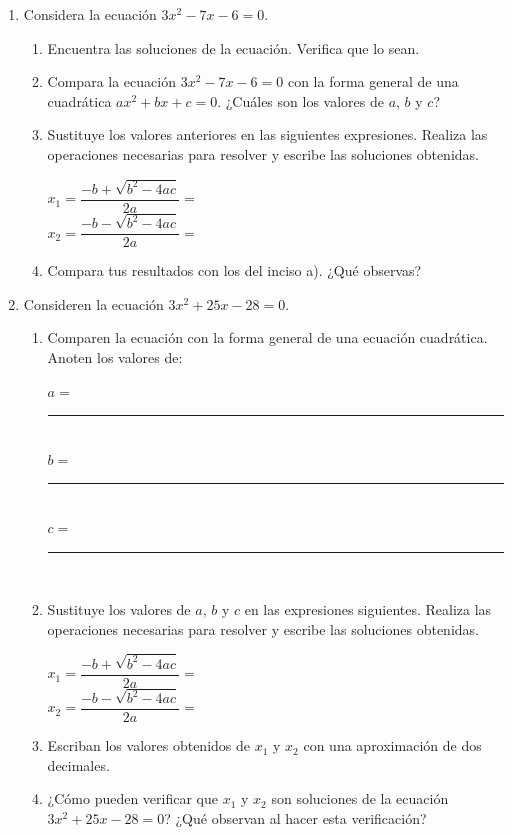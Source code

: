 \documentclass[11pt]{book}
\begin{document}
\begin{enumerate}
  \item Considera la ecuación $3x^2 - 7x - 6 = 0$.
        \begin{enumerate}
          \item Encuentra las soluciones de la ecuación. Verifica que lo sean.
          \item Compara la ecuación $3x^2 - 7x - 6 = 0$ con la forma general de una cuadrática $ax ^2 + bx + c = 0$. ¿Cuáles son los valores de $a$, $b$ y $c$?
          \item Sustituye los valores anteriores en las siguientes expresiones. Realiza las operaciones necesarias para resolver y escribe las soluciones obtenidas.

                $ x_1= \dfrac{-b+\sqrt{b^2-4ac}}{2a} = $ \\[3ex]
                $ x_2= \dfrac{-b-\sqrt{b^2-4ac}}{2a} = $
          \item Compara tus resultados con los del inciso a). ¿Qué observas?
        \end{enumerate}

  \item Consideren la ecuación $3x^2 + 25x - 28 = 0$.
        \begin{enumerate}
          \item Comparen la ecuación con la forma general de una ecuación cuadrática. Anoten
                los valores de:

                $a =$ \rule{15mm}{0.2mm}\\
                $b =$ \rule{15mm}{0.2mm}\\
                $c =$ \rule{15mm}{0.2mm}\\

          \item Sustituye los valores de $a$, $b$ y $c$ en las expresiones siguientes. Realiza las operaciones necesarias para resolver y escribe las soluciones obtenidas.

                $ x_1= \dfrac{-b+\sqrt{b^2-4ac}}{2a} = $ \\[3ex]
                $ x_2= \dfrac{-b-\sqrt{b^2-4ac}}{2a} = $

          \item  Escriban los valores obtenidos de $x_1$ y $x_2$ con una aproximación de dos decimales.
          \item ¿Cómo pueden verificar que $x_1$ y $x_2$ son soluciones de la ecuación $3x^2 + 25x - 28 = 0$? ¿Qué observan al hacer esta verificación?
        \end{enumerate}


\end{enumerate}
\end{document}
